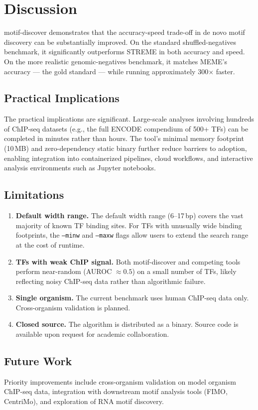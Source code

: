 \section{Discussion}
\label{sec:discussion}

motif-discover demonstrates that the accuracy-speed trade-off in de novo motif discovery can be substantially improved. On the standard shuffled-negatives benchmark, it significantly outperforms STREME in both accuracy and speed. On the more realistic genomic-negatives benchmark, it matches MEME's accuracy --- the gold standard --- while running approximately 300$\times$ faster.

\subsection{Practical Implications}

The practical implications are significant. Large-scale analyses involving hundreds of ChIP-seq datasets (e.g., the full ENCODE compendium of 500+ TFs) can be completed in minutes rather than hours. The tool's minimal memory footprint (10\,MB) and zero-dependency static binary further reduce barriers to adoption, enabling integration into containerized pipelines, cloud workflows, and interactive analysis environments such as Jupyter notebooks.

\subsection{Limitations}

\begin{enumerate}
    \item \textbf{Default width range.} The default width range (6--17\,bp) covers the vast majority of known TF binding sites. For TFs with unusually wide binding footprints, the \texttt{--minw} and \texttt{--maxw} flags allow users to extend the search range at the cost of runtime.
    
    \item \textbf{TFs with weak ChIP signal.} Both motif-discover and competing tools perform near-random (AUROC $\approx 0.5$) on a small number of TFs, likely reflecting noisy ChIP-seq data rather than algorithmic failure.
    
    \item \textbf{Single organism.} The current benchmark uses human ChIP-seq data only. Cross-organism validation is planned.
    
    \item \textbf{Closed source.} The algorithm is distributed as a binary. Source code is available upon request for academic collaboration.
\end{enumerate}

\subsection{Future Work}

Priority improvements include cross-organism validation on model organism ChIP-seq data, integration with downstream motif analysis tools (FIMO, CentriMo), and exploration of RNA motif discovery.
